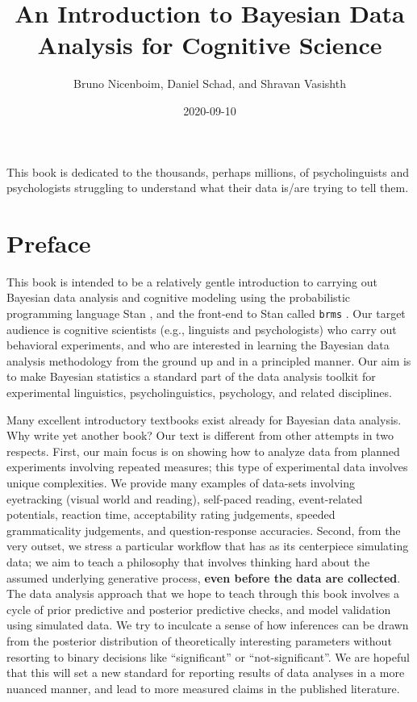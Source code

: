 \documentclass[12pt,]{krantz}
\title{An Introduction to Bayesian Data Analysis for Cognitive Science}
\author{Bruno Nicenboim, Daniel Schad, and Shravan Vasishth}
\date{2020-09-10}
\theoremstyle{definition}
\theoremstyle{definition}
\theoremstyle{definition}
\theoremstyle{remark}
\begin{document}
\maketitle

\thispagestyle{empty}
\begin{center}
This book is dedicated to the thousands, perhaps millions, of psycholinguists and psychologists struggling to understand what their data is/are trying to tell them.
\end{center}

\setlength{\abovedisplayskip}{-5pt}
\setlength{\abovedisplayshortskip}{-5pt}

{
\hypersetup{linkcolor=}
\setcounter{tocdepth}{2}
\tableofcontents
}
\hypertarget{preface}{%
\chapter*{Preface}\label{preface}}


This book is intended to be a relatively gentle introduction to carrying out Bayesian data analysis and cognitive modeling using the probabilistic programming language Stan \citep{carpenter2017stan}, and the front-end to Stan called \texttt{brms} \citep{R-brms}. Our target audience is cognitive scientists (e.g., linguists and psychologists) who carry out behavioral experiments, and who are interested in learning the Bayesian data analysis methodology from the ground up and in a principled manner. Our aim is to make Bayesian statistics a standard part of the data analysis toolkit for experimental linguistics, psycholinguistics, psychology, and related disciplines.

Many excellent introductory textbooks exist already for Bayesian data analysis. Why write yet another book? Our text is different from other attempts in two respects. First, our main focus is on showing how to analyze data from planned experiments involving repeated measures; this type of experimental data involves unique complexities. We provide many examples of data-sets involving eyetracking (visual world and reading), self-paced reading, event-related potentials, reaction time, acceptability rating judgements, speeded grammaticality judgements, and question-response accuracies. Second, from the very outset, we stress a particular workflow that has as its centerpiece simulating data; we aim to teach a philosophy that involves thinking hard about the assumed underlying generative process, \textbf{even before the data are collected}. The data analysis approach that we hope to teach through this book involves a cycle of prior predictive and posterior predictive checks, and model validation using simulated data. We try to inculcate a sense of how inferences can be drawn from the posterior distribution of theoretically interesting parameters without resorting to binary decisions like ``significant'' or ``not-significant''. We are hopeful that this will set a new standard for reporting results of data analyses in a more nuanced manner, and lead to more measured claims in the published literature.
\end{document}
